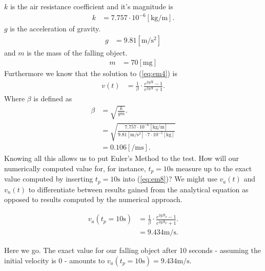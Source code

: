 \documentclass[paper=a4, fontsize=11pt]{scrartcl} %
\numberwithin{equation}{section} %
\numberwithin{figure}{section} %
\numberwithin{table}{section} %
\begin{document}
$k$ is the air resistance coefficient and it's magnitude is
\begin{align} \label{eq:em5}
k &= 7.757 \cdot 10^{-6}[\si{\kilogram\per\meter}].
\end{align}
$g$ is the acceleration of gravity.
\begin{align} \label{eq:em6}
g &= 9.81 [\si{\meter\per\second\squared}]
\end{align}
and $m$ is the mass of the falling object.
\begin{align} \label{eq:em7}
m &= 70 [\si{\milli\gram}]
\end{align}
Furthermore we know that the solution to (\ref{eq:em4}) is
\begin{align}
v(t) &= \frac{1}{\beta} \cdot \frac{e^{2 g \beta t} - 1}{e^{2 g \beta t} + 1}.\label{eq:em8}
\end{align}
Where $\beta$ is defined as
\begin{align} 
\beta &= \sqrt{\frac{k}{gm}}. \\
      &= \sqrt{\frac{7.757 \cdot 10^{-6}[\si{\kilogram\per\meter}]}{9.81 [\si{\meter\per\second\squared}] \cdot 7 \cdot 10^{-5} [\si{\kilo\gram}]}} \\
      &= 0.106 [\si{\per\meter\second}]. \label{eq:em9}
\end{align}
Knowing all this allows us to put Euler's Method to the test. How will our numerically computed value for, for instance, $t_p = 10 \si{\second}$ measure up to the exact value 
computed by inserting $t_p = 10 \si{\second}$ into (\ref{eq:em8})? We might use $v_a(t)$ and $v_n(t)$ to differentiate between results gained from the analytical equation 
as opposed to results computed by the numerical approach. 

\begin{align}
v_a(t_p = 10\si{\second}) &= \frac{1}{\beta} \cdot \frac{e^{2 g \beta t_p} - 1}{e^{2 g \beta t_p} + 1}.\label{eq:em10} \\
 &= 9.434 \si{\meter\per\second}.\label{eq:em11}
\end{align}

Here we go. The exact value for our falling object after 10 seconds - assuming the initial velocity is 0 - 
amounts to $v_a(t_p = 10\si{\second}) = 9.434 \si{\meter\per\second}$.
\end{document}

